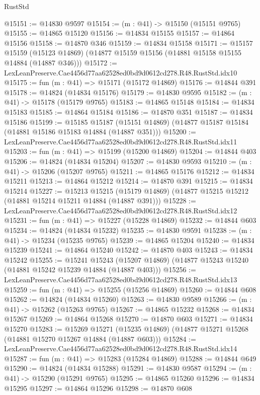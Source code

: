 \begin{lexlean}{RustStd}
\begin{coremodule}
@15151 := @14830 @9597
@15154 := (m : @41) -> @15150 (@15151 @9765)
@15155 := @14865 @15120
@15156 := @14834 @15155
@15157 := @14864 @15156
@15158 := @14870 @346
@15159 := @14834 @15158
@15171 := @15157
    @15159
    (@15123 @14869)
    (@14877 @15159 @15156 (@14881 @15158 @15155 @14884 (@14887 @346)))
@15172 := LexLeanPreserve.Cae4456d77aa62528ed0bd9d0612cd278.R48.RustStd.idx10
@15175 := fun (m : @41) => @15171 (@15172 @14869)
@15176 := @14844 @391
@15178 := @14824 (@14834 @15176)
@15179 := @14830 @9595
@15182 := (m : @41) -> @15178 (@15179 @9765)
@15183 := @14865 @15148
@15184 := @14834 @15183
@15185 := @14864 @15184
@15186 := @14870 @351
@15187 := @14834 @15186
@15199 := @15185
    @15187
    (@15151 @14869)
    (@14877 @15187 @15184 (@14881 @15186 @15183 @14884 (@14887 @351)))
@15200 := LexLeanPreserve.Cae4456d77aa62528ed0bd9d0612cd278.R48.RustStd.idx11
@15203 := fun (m : @41) => @15199 (@15200 @14869)
@15204 := @14844 @403
@15206 := @14824 (@14834 @15204)
@15207 := @14830 @9593
@15210 := (m : @41) -> @15206 (@15207 @9765)
@15211 := @14865 @15176
@15212 := @14834 @15211
@15213 := @14864 @15212
@15214 := @14870 @391
@15215 := @14834 @15214
@15227 := @15213
    @15215
    (@15179 @14869)
    (@14877 @15215 @15212 (@14881 @15214 @15211 @14884 (@14887 @391)))
@15228 := LexLeanPreserve.Cae4456d77aa62528ed0bd9d0612cd278.R48.RustStd.idx12
@15231 := fun (m : @41) => @15227 (@15228 @14869)
@15232 := @14844 @603
@15234 := @14824 (@14834 @15232)
@15235 := @14830 @9591
@15238 := (m : @41) -> @15234 (@15235 @9765)
@15239 := @14865 @15204
@15240 := @14834 @15239
@15241 := @14864 @15240
@15242 := @14870 @403
@15243 := @14834 @15242
@15255 := @15241
    @15243
    (@15207 @14869)
    (@14877 @15243 @15240 (@14881 @15242 @15239 @14884 (@14887 @403)))
@15256 := LexLeanPreserve.Cae4456d77aa62528ed0bd9d0612cd278.R48.RustStd.idx13
@15259 := fun (m : @41) => @15255 (@15256 @14869)
@15260 := @14844 @608
@15262 := @14824 (@14834 @15260)
@15263 := @14830 @9589
@15266 := (m : @41) -> @15262 (@15263 @9765)
@15267 := @14865 @15232
@15268 := @14834 @15267
@15269 := @14864 @15268
@15270 := @14870 @603
@15271 := @14834 @15270
@15283 := @15269
    @15271
    (@15235 @14869)
    (@14877 @15271 @15268 (@14881 @15270 @15267 @14884 (@14887 @603)))
@15284 := LexLeanPreserve.Cae4456d77aa62528ed0bd9d0612cd278.R48.RustStd.idx14
@15287 := fun (m : @41) => @15283 (@15284 @14869)
@15288 := @14844 @649
@15290 := @14824 (@14834 @15288)
@15291 := @14830 @9587
@15294 := (m : @41) -> @15290 (@15291 @9765)
@15295 := @14865 @15260
@15296 := @14834 @15295
@15297 := @14864 @15296
@15298 := @14870 @608

\end{coremodule}
\end{lexlean}
